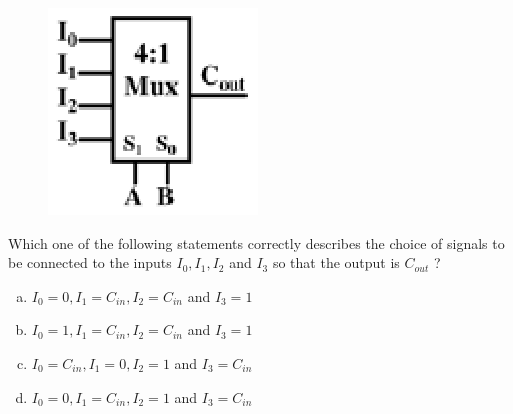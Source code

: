 \documentclass[journal,12pt,twocolumn]{IEEEtran}
\begin{document}
\begin{enumerate}
\begin{figure}

\centering

\includegraphics[width=\columnwidth]{./figs/60.eps}

\caption{}

\label{fig:54}

\end{figure} 



Which one of the following statements correctly describes the choice of signals to be connected to the inputs $ I_0, I_1, I_2 $ and $ I_3 $ so that the output is $ C_{out}$ ?

\begin{enumerate}[(a)]

\item $ I_0=0, I_1=C_{in}, I_2=C_{in} $ and $ I_3=1 $

\item $ I_0=1, I_1=C_{in}, I_2=C_{in} $ and $ I_3=1 $

\item $ I_0=C_{in}, I_1=0, I_2=1 $ and $ I_3=C_{in} $

\item $ I_0=0, I_1=C_{in}, I_2=1 $ and $ I_3=C_{in} $

\end{enumerate}


\end{enumerate}
\end{document}
